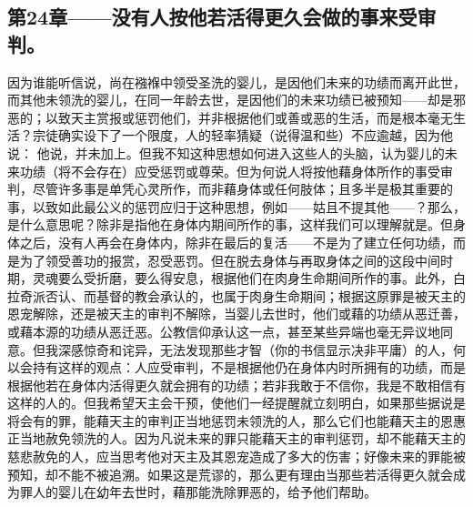 
\subsection{第24章——没有人按他若活得更久会做的事来受审判。}

因为谁能听信说，尚在襁褓中领受圣洗的婴儿，是因他们未来的功绩而离开此世，而其他未领洗的婴儿，在同一年龄去世，是因他们的未来功绩已被预知——却是邪恶的；以致天主赏报或惩罚他们，并非根据他们或善或恶的生活，而是根本毫无生活？宗徒确实设下了一个限度，人的轻率猜疑（说得温和些）不应逾越，因为他说：  他说，并未加上。但我不知这种思想如何进入这些人的头脑，认为婴儿的未来功绩（将不会存在）应受惩罚或尊荣。但为何说人将按他藉身体所作的事受审判，尽管许多事是单凭心灵所作，而非藉身体或任何肢体；且多半是极其重要的事，以致如此最公义的惩罚应归于这种思想，例如——姑且不提其他——？那么，是什么意思呢？除非是指他在身体内期间所作的事，这样我们可以理解就是。但身体之后，没有人再会在身体内，除非在最后的复活——不是为了建立任何功绩，而是为了领受善功的报赏，忍受恶罚。但在脱去身体与再取身体之间的这段中间时期，灵魂要么受折磨，要么得安息，根据他们在肉身生命期间所作的事。此外，白拉奇派否认、而基督的教会承认的，也属于肉身生命期间；根据这原罪是被天主的恩宠解除，还是被天主的审判不解除，当婴儿去世时，他们或藉的功绩从恶迁善，或藉本源的功绩从恶迁恶。公教信仰承认这一点，甚至某些异端也毫无异议地同意。但我深感惊奇和诧异，无法发现那些才智（你的书信显示决非平庸）的人，何以会持有这样的观点：人应受审判，不是根据他仍在身体内时所拥有的功绩，而是根据他若在身体内活得更久就会拥有的功绩；若非我敢于不信你，我是不敢相信有这样的人的。但我希望天主会干预，使他们一经提醒就立刻明白，如果那些据说是将会有的罪，能藉天主的审判正当地惩罚未领洗的人，那么它们也能藉天主的恩惠正当地赦免领洗的人。因为凡说未来的罪只能藉天主的审判惩罚，却不能藉天主的慈悲赦免的人，应当思考他对天主及其恩宠造成了多大的伤害；好像未来的罪能被预知，却不能不被追溯。如果这是荒谬的，那么更有理由当那些若活得更久就会成为罪人的婴儿在幼年去世时，藉那能洗除罪恶的，给予他们帮助。\par


